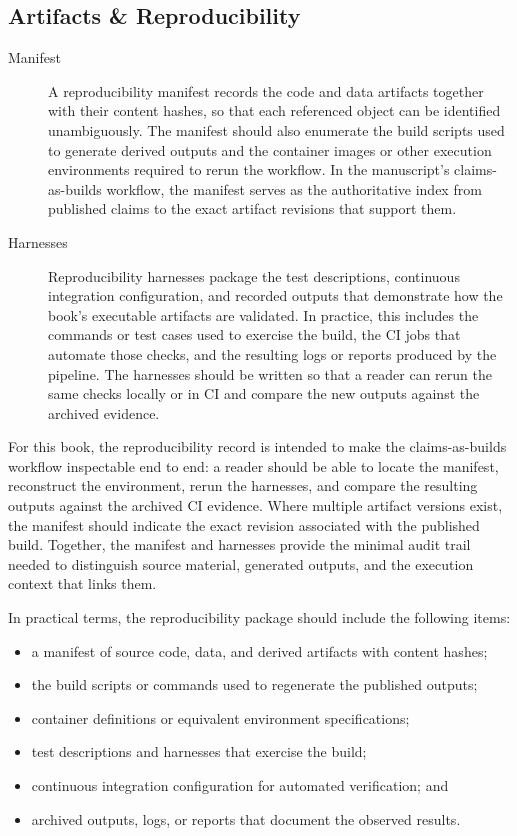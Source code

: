 \documentclass[11pt]{article}
\begin{document}
\subsection{Artifacts \& Reproducibility}

\begin{description}
  \item[Manifest] A reproducibility manifest records the code and data artifacts together with their content hashes, so that each referenced object can be identified unambiguously. The manifest should also enumerate the build scripts used to generate derived outputs and the container images or other execution environments required to rerun the workflow. In the manuscript's claims-as-builds workflow, the manifest serves as the authoritative index from published claims to the exact artifact revisions that support them.

  \item[Harnesses] Reproducibility harnesses package the test descriptions, continuous integration configuration, and recorded outputs that demonstrate how the book's executable artifacts are validated. In practice, this includes the commands or test cases used to exercise the build, the CI jobs that automate those checks, and the resulting logs or reports produced by the pipeline. The harnesses should be written so that a reader can rerun the same checks locally or in CI and compare the new outputs against the archived evidence.
\end{description}

For this book, the reproducibility record is intended to make the claims-as-builds workflow inspectable end to end: a reader should be able to locate the manifest, reconstruct the environment, rerun the harnesses, and compare the resulting outputs against the archived CI evidence. Where multiple artifact versions exist, the manifest should indicate the exact revision associated with the published build. Together, the manifest and harnesses provide the minimal audit trail needed to distinguish source material, generated outputs, and the execution context that links them.

In practical terms, the reproducibility package should include the following items:
\begin{itemize}
  \item a manifest of source code, data, and derived artifacts with content hashes;
  \item the build scripts or commands used to regenerate the published outputs;
  \item container definitions or equivalent environment specifications;
  \item test descriptions and harnesses that exercise the build;
  \item continuous integration configuration for automated verification; and
  \item archived outputs, logs, or reports that document the observed results.
\end{itemize}
\end{document}
